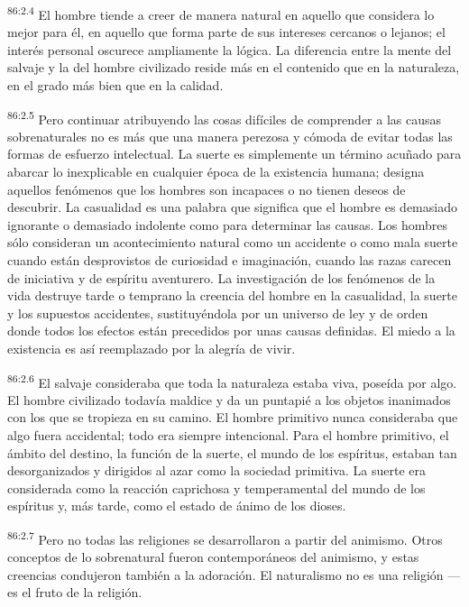 \documentclass[twoside, 11pt]{book}
\begin{document}
\par
\textsuperscript{86:2.4} El hombre tiende a creer de manera natural en aquello que considera lo mejor para él, en aquello que forma parte de sus intereses cercanos o lejanos; el interés personal oscurece ampliamente la lógica. La diferencia entre la mente del salvaje y la del hombre civilizado reside más en el contenido que en la naturaleza, en el grado más bien que en la calidad.

\par
\textsuperscript{86:2.5} Pero continuar atribuyendo las cosas difíciles de comprender a las causas sobrenaturales no es más que una manera perezosa y cómoda de evitar todas las formas de esfuerzo intelectual. La suerte es simplemente un término acuñado para abarcar lo inexplicable en cualquier época de la existencia humana; designa aquellos fenómenos que los hombres son incapaces o no tienen deseos de descubrir. La casualidad es una palabra que significa que el hombre es demasiado ignorante o demasiado indolente como para determinar las causas. Los hombres sólo consideran un acontecimiento natural como un accidente o como mala suerte cuando están desprovistos de curiosidad e imaginación, cuando las razas carecen de iniciativa y de espíritu aventurero. La investigación de los fenómenos de la vida destruye tarde o temprano la creencia del hombre en la casualidad, la suerte y los supuestos accidentes, sustituyéndola por un universo de ley y de orden donde todos los efectos están precedidos por unas causas definidas. El miedo a la existencia es así reemplazado por la alegría de vivir.

\par
\textsuperscript{86:2.6} El salvaje consideraba que toda la naturaleza estaba viva, poseída por algo. El hombre civilizado todavía maldice y da un puntapié a los objetos inanimados con los que se tropieza en su camino. El hombre primitivo nunca consideraba que algo fuera accidental; todo era siempre intencional. Para el hombre primitivo, el ámbito del destino, la función de la suerte, el mundo de los espíritus, estaban tan desorganizados y dirigidos al azar como la sociedad primitiva. La suerte era considerada como la reacción caprichosa y temperamental del mundo de los espíritus y, más tarde, como el estado de ánimo de los dioses.

\par
\textsuperscript{86:2.7} Pero no todas las religiones se desarrollaron a partir del animismo. Otros conceptos de lo sobrenatural fueron contemporáneos del animismo, y estas creencias condujeron también a la adoración. El naturalismo no es una religión ---es el fruto de la religión.
\end{document}
